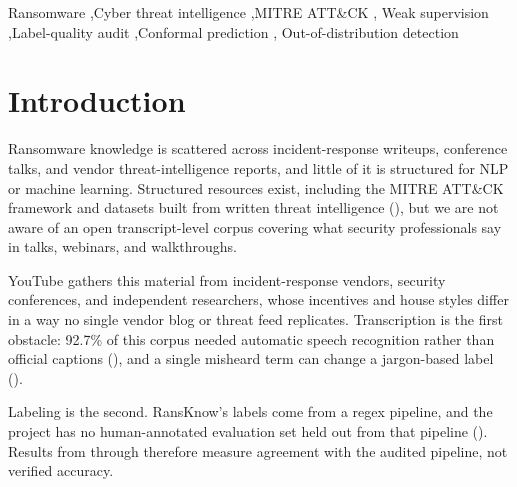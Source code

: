 \documentclass[preprint,12pt]{elsarticle}
\begin{document}
\begin{frontmatter}
\begin{keyword}
Ransomware \sep Cyber threat intelligence \sep MITRE ATT\&CK \sep
Weak supervision \sep Label-quality audit \sep Conformal prediction \sep
Out-of-distribution detection
\end{keyword}

\end{frontmatter}

\section{Introduction}
\label{sec:intro}

Ransomware knowledge is scattered across incident-response writeups,
conference talks, and vendor threat-intelligence reports, and little of
it is structured for NLP or machine learning. Structured resources exist,
including the MITRE ATT\&CK framework \citep{strom2018attack} and datasets
built from written threat intelligence (), but we are
not aware of an open transcript-level corpus covering what security
professionals say in talks, webinars, and walkthroughs.

YouTube gathers this material from incident-response vendors, security
conferences, and independent researchers, whose incentives and house
styles differ in a way no single vendor blog or threat feed replicates.
Transcription is the first obstacle: 92.7\% of this corpus needed
automatic speech recognition rather than official captions
(), and a single misheard term can change a
jargon-based label ().

Labeling is the second. RansKnow's labels come from a regex pipeline, and
the project has no human-annotated evaluation set held out from that
pipeline (). Results from 
through  therefore measure agreement with the audited
pipeline, not verified accuracy.
\end{document}
